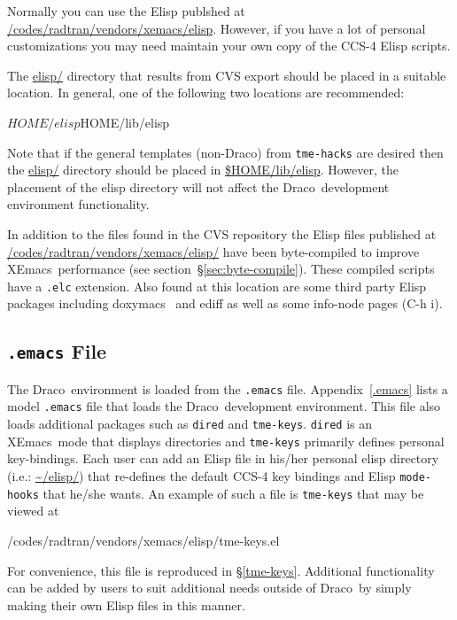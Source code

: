 \documentclass[11pt]{nmemo}
\newcommand{\comp}[1]{{\normalfont\texttt{\footnotesize{#1}}}}
\newcommand{\draco}{{\normalfont\sffamily Draco}}
\newcommand{\xemacs}{{\normalfont\sffamily XEmacs}}
\newenvironment{code}
{\footnotesize 
  \VerbatimEnvironment
  \begin{SaveVerbatim}{\mycode}}%
  {\end{SaveVerbatim}%
  \noindent%
  \UseVerbatim{\mycode}\normalsize}
\begin{document}
Normally you can use the Elisp publshed at
\url{/codes/radtran/vendors/xemacs/elisp}.  However, if you have a lot
of personal customizations you may need maintain your own copy of the
CCS-4 Elisp scripts.

The \url{elisp/} directory that results from CVS export should be
placed in a suitable location.  In general, one of the following two
locations are recommended:
\begin{code}
     $HOME/elisp
     $HOME/lib/elisp
\end{code}

Note that if the general templates (non-\draco) from \comp{tme-hacks}
are desired then the \url{elisp/} directory should be placed in
\url{$HOME/lib/elisp}.  However, the placement of the elisp %
directory will not affect the \draco\ development environment
functionality.

In addition to the files found in the CVS repository the Elisp files
published at \url{/codes/radtran/vendors/xemacs/elisp/} have been
byte-compiled to improve \xemacs\ performance (see
section~\S\ref{sec:byte-compile}).  These compiled scripts have a
\comp{.elc} extension.  Also found at this location are some third
party Elisp packages including doxymacs~\cite{doxymacs} and ediff as
well as some info-node pages (C-h i).

\subsection{\comp{.emacs} File}
\label{sec:.emacs}

The \draco\ environment is loaded from the \comp{.emacs} file.
Appendix~\ref{.emacs} lists a model \comp{.emacs} file that loads the
\draco\ development environment.  This file also loads additional
packages such as \comp{dired} and \comp{tme-keys}.  \comp{dired} is an
\xemacs\ mode that displays directories and \comp{tme-keys} primarily
defines personal key-bindings.  Each user can add an Elisp file in
his/her personal elisp directory (i.e.: \url{~/elisp/}) that
re-defines the default CCS-4 key bindings and Elisp \comp{mode-hooks}
that he/she wants.  An example of such a file is \comp{tme-keys} that
may be viewed at

\begin{code}
     /codes/radtran/vendors/xemacs/elisp/tme-keys.el
\end{code}

For convenience, this file is reproduced in \S\ref{tme-keys}.
Additional functionality can be added by users to suit additional
needs outside of \draco\ by simply making their own Elisp files in
this manner.
\end{document}
